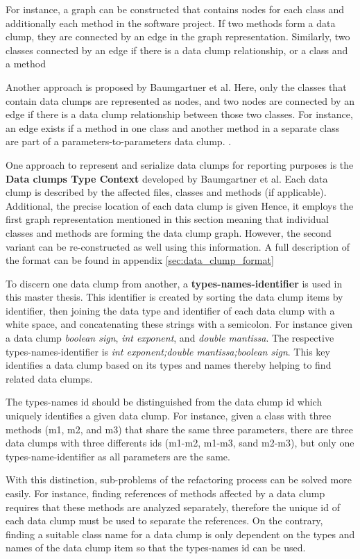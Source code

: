 For instance, a graph can be constructed that contains nodes for each class and additionally each method in the software project. If two methods form a data clump, they are connected by an edge in the graph representation. Similarly, two classes connected by an edge if there is a data clump relationship, or a class and a method   

Another approach is proposed by Baumgartner et al. Here, only the classes that contain data clumps are represented as nodes, and two nodes are connected by an edge if there is a data clump relationship between those two classes. For instance, an edge exists if a method in one class and another method in a separate class are part of a parameters-to-parameters data clump. \cite{data_clumps_baumgartner}.


One approach to represent and serialize data clumps for reporting purposes is the \textbf{Data clumps Type Context} \cite{dataclump_type_context} developed by Baumgartner et al. Each data clump is described by the affected files, classes and methods (if applicable). Additional, the precise location of each data clump is given Hence,  it employs the first graph representation mentioned in this section meaning that individual classes and methods are forming the data clump graph. However, the second variant can be re-constructed as well using this information. 
A full description of the format can be found in appendix \ref{sec:data_clump_format}

To discern one data clump from another, a \textbf{types-names-identifier} is used in this master thesis. This identifier is created by sorting the data clump items by identifier, then joining the data type and identifier of each data clump with a white space, and concatenating these strings with a semicolon. For instance given a data clump \textit{boolean sign}, \textit{int exponent}, and \textit{double mantissa}. The respective types-names-identifier is \textit{int exponent;double mantissa;boolean sign}. This key identifies a data clump based on its types and names thereby helping to find related data clumps. 

The types-names id should be distinguished from the data clump id which uniquely identifies a given data clump. For instance, given a class with three methods (m1, m2, and m3) that share the same three parameters, there are three data clumps with three differents ids (m1-m2, m1-m3, sand m2-m3), but only one types-name-identifier as all parameters are the same. 

With this distinction, sub-problems of the refactoring process can be solved more easily. For instance, finding references of methods affected by a data clump requires that these methods are analyzed separately, therefore the unique id of each data clump must be used to separate the references. On the contrary, finding a suitable class name for a data clump is only dependent on the types and names of the data clump item so that the types-names id can be used. 





